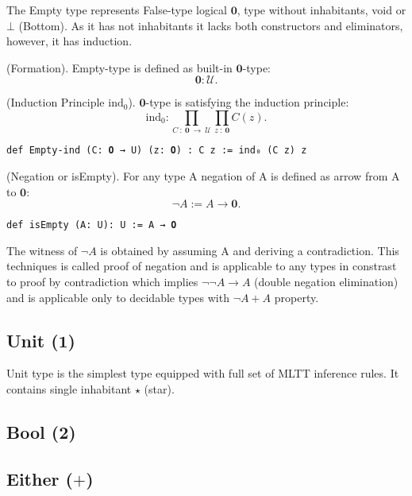 \documentclass{article}
\begin{document}
The Empty type represents False-type logical $\mathbf{0}$, type without inhabitants, void or $\bot$ (Bottom).
As it has not inhabitants it lacks both constructors and eliminators, however, it has induction.

\begin{definition} (Formation).
Empty-type is defined as built-in $\mathbf{0}$-type:
$$
 \mathbf{0} : \mathcal{U}.
$$
\end{definition}

\begin{theorem} (Induction Principle $\mathrm{ind_0}$).
$\mathbf{0}$-type is satisfying the induction principle:
$$
  \mathrm{ind_0} : \prod_{C\ :\ \mathbf{0}\ \rightarrow\ \mathcal{U}} \prod_{z\ :\ \mathbf{0}} C(z).
$$
\begin{lstlisting}
def Empty-ind (C: 𝟎 → U) (z: 𝟎) : C z := ind₀ (C z) z
\end{lstlisting}
\end{theorem}

\begin{definition} (Negation or isEmpty).
For any type A negation of A is defined as arrow from A to $\mathbf{0}$:
$$
  \neg A := A \rightarrow \mathbf{0}.
$$
\begin{lstlisting}
def isEmpty (A: U): U := A → 𝟎
\end{lstlisting}
\end{definition}

The witness of $\neg A$ is obtained by assuming A and deriving a contradiction.
This techniques is called proof of negation and is applicable to any types in constrast
to proof by contradiction which implies $\neg\neg A \rightarrow A$ (double negation elimination) and is
applicable only to decidable types with $\neg A + A$ property.

\newpage
\subsection{Unit (\(\mathbf{1}\))}
Unit type is the simplest type equipped with full set of MLTT inference rules. It contains single inhabitant $\star$ (star).

\subsection{Bool (\(\mathbf{2}\))}

\subsection{Either (\(\mathbf{+}\))}
\end{document}
